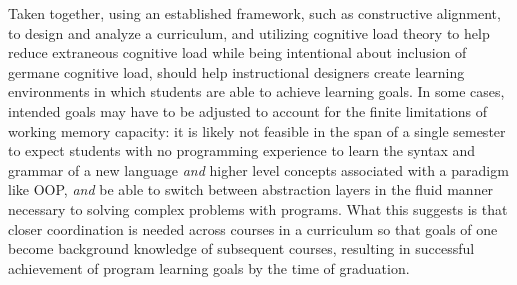 \documentclass[12pt]{article}
\let\textcite=\autocite
\begin{document}
Taken together, using an established framework, such as constructive
alignment, to design and analyze a curriculum, and utilizing cognitive
load theory to help reduce extraneous cognitive load while being
intentional about inclusion of germane cognitive load, should help
instructional designers create learning environments in which students
are able to achieve learning goals. In some cases, intended goals may
have to be adjusted to account for the finite limitations of working
memory capacity: it is likely not feasible in the span of a single
semester to expect students with no programming experience to learn
the syntax and grammar of a new language \emph{and} higher level
concepts associated with a paradigm like OOP, \emph{and} be able to
switch between abstraction layers in the fluid manner necessary to
solving complex problems with programs. What this suggests is that
closer coordination is needed across courses in a curriculum so that
goals of one become background knowledge of subsequent courses,
resulting in successful achievement of program learning goals by the
time of graduation.


\end{document}
